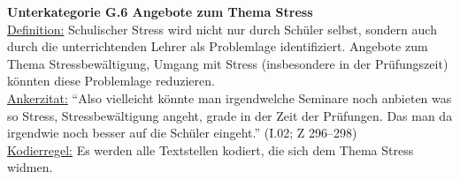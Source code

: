 \textbf{Unterkategorie G.6 Angebote zum Thema Stress}\\
\underline{Definition:} Schulischer Stress wird nicht nur durch Schüler selbst, sondern auch durch die unterrichtenden Lehrer als Problemlage identifiziert. Angebote zum Thema Stressbewältigung, Umgang mit Stress (insbesondere in der Prüfungszeit) könnten diese Problemlage reduzieren.\\
\underline{Ankerzitat:} "`Also vielleicht könnte man irgendwelche Seminare noch anbieten was so Stress, Stressbewältigung angeht, grade in der Zeit der Prüfungen. Das man da irgendwie noch besser auf die Schüler eingeht."' (I.02; Z 296--298)\\
\underline{Kodierregel:} Es werden alle Textstellen kodiert, die sich dem Thema Stress widmen.\\

